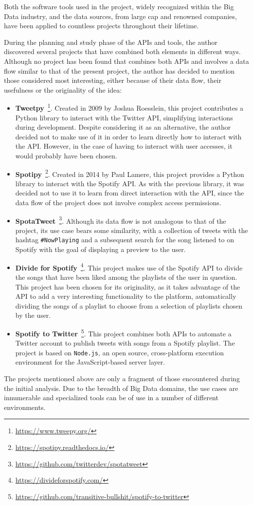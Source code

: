 
\nonzeroparskip Both the software tools used in the project, widely recognized within the Big Data industry, and the data sources, from large cap and renowned companies, have been applied to countless projects throughout their lifetime.

\nonzeroparskip During the planning and study phase of the APIs and tools, the author discovered several projects that have combined both elements in different ways. Although no project has been found that combines both APIs and involves a data flow similar to that of the present project, the author has decided to mention those considered most interesting, either because of their data flow, their usefulness or the originality of the idea:

\begin{itemize}
	\item \textbf{Tweetpy}~\footnote{\url{https://www.tweepy.org/}}. Created in 2009 by Joshua Roesslein, this project contributes a Python library to interact with the Twitter API, simplifying interactions during development. Despite considering it as an alternative, the author decided not to make use of it in order to learn directly how to interact with the API. However, in the case of having to interact with user accesses, it would probably have been chosen.
	\item \textbf{Spotipy}~\footnote{\url{https://spotipy.readthedocs.io/}}. Created in 2014 by Paul Lamere, this project provides a Python library to interact with the Spotify API. As with the previous library, it was decided not to use it to learn from direct interaction with the API, since the data flow of the project does not involve complex access permissions.
	\item \textbf{SpotaTweet}~\footnote{\url{https://github.com/twitterdev/spotatweet}}. Although its data flow is not analogous to that of the project, its use case bears some similarity, with a collection of tweets with the hashtag \texttt{\#NowPlaying} and a subsequent search for the song listened to on Spotify with the goal of displaying a preview to the user.
	\item \textbf{Divide for Spotify}~\footnote{\url{https://divideforspotify.com/}}. This project makes use of the Spotify API to divide the songs that have been liked among the playlists of the user in question. This project has been chosen for its originality, as it takes advantage of the API to add a very interesting functionality to the platform, automatically dividing the songs of a playlist to choose from a selection of playlists chosen by the user.
	\item \textbf{Spotify to Twitter}~\footnote{\url{https://github.com/transitive-bullshit/spotify-to-twitter}}. This project combines both APIs to automate a Twitter account to publish tweets with songs from a Spotify playlist. The project is based on \texttt{Node.js}, an open source, cross-platform execution environment for the JavaScript-based server layer.
\end{itemize}

\nonzeroparskip The projects mentioned above are only a fragment of those encountered during the initial analysis. Due to the breadth of Big Data domains, the use cases are innumerable and specialized tools can be of use in a number of different environments.